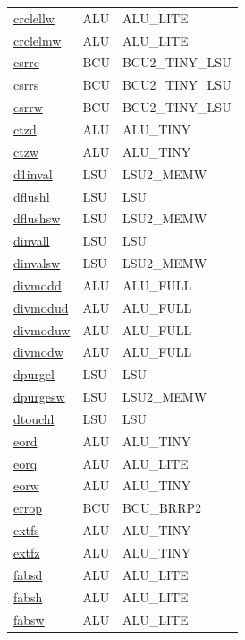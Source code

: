 \begin{small}
\begin{longtable}[l]{l l l}
\hyperlink{lvx.crclellw}{crclellw} & ALU & ALU\_LITE \\ 
\hyperlink{lvx.crclelmw}{crclelmw} & ALU & ALU\_LITE \\ 
\hyperlink{lvx.csrrc}{csrrc} & BCU & BCU2\_TINY\_LSU \\ 
\hyperlink{lvx.csrrs}{csrrs} & BCU & BCU2\_TINY\_LSU \\ 
\hyperlink{lvx.csrrw}{csrrw} & BCU & BCU2\_TINY\_LSU \\ 
\hyperlink{lvx.ctzd}{ctzd} & ALU & ALU\_TINY \\ 
\hyperlink{lvx.ctzw}{ctzw} & ALU & ALU\_TINY \\ 
\hyperlink{lvx.d1inval}{d1inval} & LSU & LSU2\_MEMW \\ 
\hyperlink{lvx.dflushl}{dflushl} & LSU & LSU \\ 
\hyperlink{lvx.dflushsw}{dflushsw} & LSU & LSU2\_MEMW \\ 
\hyperlink{lvx.dinvall}{dinvall} & LSU & LSU \\ 
\hyperlink{lvx.dinvalsw}{dinvalsw} & LSU & LSU2\_MEMW \\ 
\hyperlink{lvx.divmodd}{divmodd} & ALU & ALU\_FULL \\ 
\hyperlink{lvx.divmodud}{divmodud} & ALU & ALU\_FULL \\ 
\hyperlink{lvx.divmoduw}{divmoduw} & ALU & ALU\_FULL \\ 
\hyperlink{lvx.divmodw}{divmodw} & ALU & ALU\_FULL \\ 
\hyperlink{lvx.dpurgel}{dpurgel} & LSU & LSU \\ 
\hyperlink{lvx.dpurgesw}{dpurgesw} & LSU & LSU2\_MEMW \\ 
\hyperlink{lvx.dtouchl}{dtouchl} & LSU & LSU \\ 
\hyperlink{lvx.eord}{eord} & ALU & ALU\_TINY \\ 
\hyperlink{lvx.eorq}{eorq} & ALU & ALU\_LITE \\ 
\hyperlink{lvx.eorw}{eorw} & ALU & ALU\_TINY \\ 
\hyperlink{lvx.errop}{errop} & BCU & BCU\_BRRP2 \\ 
\hyperlink{lvx.extfs}{extfs} & ALU & ALU\_TINY \\ 
\hyperlink{lvx.extfz}{extfz} & ALU & ALU\_TINY \\ 
\hyperlink{lvx.fabsd}{fabsd} & ALU & ALU\_LITE \\ 
\hyperlink{lvx.fabsh}{fabsh} & ALU & ALU\_LITE \\ 
\hyperlink{lvx.fabsw}{fabsw} & ALU & ALU\_LITE \\ 

\end{longtable}
\end{small}
